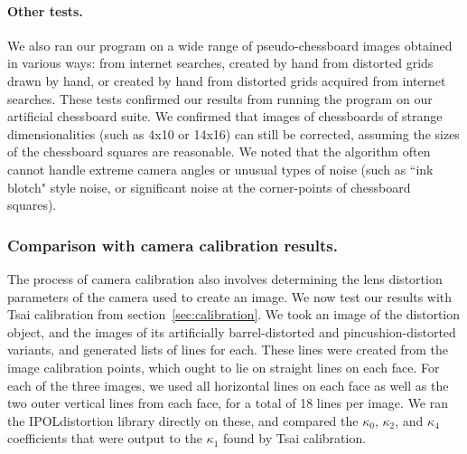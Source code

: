 \paragraph{Other tests.}
We also ran our program on a wide range of pseudo-chessboard images obtained in various ways: from internet searches, created by hand from distorted grids drawn by hand, or created by hand from distorted grids acquired from internet searches. These tests confirmed our results from running the program on our artificial chessboard suite. We confirmed that images of chessboards of strange dimensionalities (such as 4x10 or 14x16) can still be corrected, assuming the sizes of the chessboard squares are reasonable. We noted that the algorithm often cannot handle extreme camera angles or unusual types of noise (such as ``ink blotch" style noise, or significant noise at the corner-points of chessboard squares).

\subsubsection{Comparison with camera calibration results.}

The process of camera calibration also involves determining the lens distortion parameters of the camera used to create an image. We now test our results with Tsai calibration from section~\ref{sec:calibration}. We took an image of the distortion object, and the images of its artificially barrel-distorted and pincushion-distorted variants, and generated lists of lines for each. These lines were created from the image calibration points, which ought to lie on straight lines on each face. For each of the three images, we used all horizontal lines on each face as well as the two outer vertical lines from each face, for a total of 18 lines per image. We ran the IPOLdistortion library directly on these, and compared the $\kappa_{0}$, $\kappa_{2}$, and $\kappa_{4}$ coefficients that were output to the $\kappa_{1}$ found by Tsai calibration.

